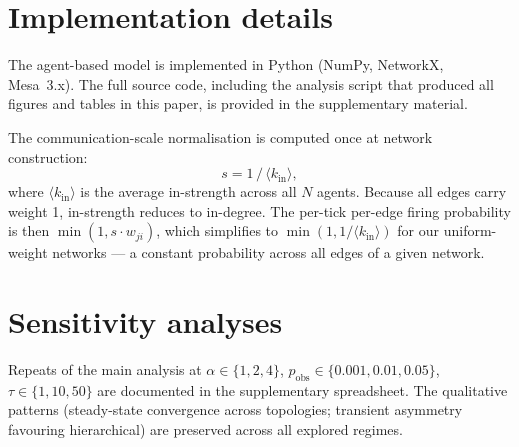 \documentclass{article}
\begin{document}
\section{Implementation details}

The agent-based model is implemented in Python (NumPy, NetworkX, Mesa~3.x). The full source code, including the analysis script that produced all figures and tables in this paper, is provided in the supplementary material.

The communication-scale normalisation is computed once at network construction:
$$
s = 1\,/\,\langle k_{\text{in}}\rangle,
$$
where $\langle k_{\text{in}}\rangle$ is the average in-strength across all $N$ agents. Because all edges carry weight 1, in-strength reduces to in-degree. The per-tick per-edge firing probability is then $\min(1, s \cdot w_{ji})$, which simplifies to $\min(1, 1/\langle k_{\text{in}}\rangle)$ for our uniform-weight networks --- a constant probability across all edges of a given network.

\section{Sensitivity analyses}

Repeats of the main analysis at $\alpha\in\{1,2,4\}$, $p_{\text{obs}}\in\{0.001,0.01,0.05\}$, $\tau\in\{1,10,50\}$ are documented in the supplementary spreadsheet. The qualitative patterns (steady-state convergence across topologies; transient asymmetry favouring hierarchical) are preserved across all explored regimes.
\end{document}
